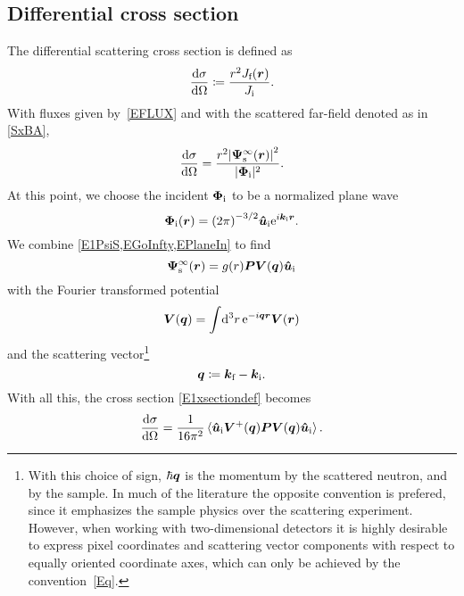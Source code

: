 \subsection{Differential cross section}\label{Sxsect0}

The differential scattering cross section is defined as
%
%
%
%
%
%
\begin{equation}\label{E1xsectiondef}
  \xElas
  \coloneqq  \frac{r^2 J_\sf(\r)}{J_\si}.
\end{equation}
%
%
With fluxes given by~\cref{EFLUX}
and with the scattered far-field denoted as in \cref{SxBA},
\begin{equation}\label{E1xsectiondef}
  \xElas
  = \frac{r^2 {|\v\Psi^\infty_\text{s}(\r)|}^2}{|\v\Phi_\si|^2}.
\end{equation}
At this point,
we choose the incident $\bm{\Phi}_{\text{i}}$ to be
a normalized plane wave
\begin{equation}\label{EPlaneIn}
   \v\Phi_\si(\r)
   = {(2\pi)}^{-3/2} \v{\hat u}_\si \e^{i\k_\si\r}.
\end{equation}
We combine \cref{E1PsiS,EGoInfty,EPlaneIn} to find
\begin{equation}\label{E1PsiS2}
  \v\Psi_\text{s}^\infty(\r)
  = g(r) \v{P} \TV(\v{q})\v{\hat u}_\si
\end{equation}
with the Fourier transformed potential
\begin{equation}
  \bm{V}(\bm{q})
  = \int\!\mathrm d^3r\,\mathrm e^{-i\bm{q}\bm{r}}\bm{V}(\bm{r})
\end{equation}
and the scattering vector\footnote
{With this choice of sign,
%
$\hbar\bm{q}$ is the momentum
%
 by the scattered neutron,
and  by the sample.
In much of the literature the opposite convention is prefered,
since it emphasizes the sample physics over the scattering experiment.
However, when working with two-dimensional detectors
it is highly desirable to express pixel coordinates
and scattering vector components
with respect to equally oriented coordinate axes,
which can only be achieved by the convention~\cref{Eq}.}
%
\begin{equation}\label{Eq}
  \q\coloneqq \k_\sf-\k_\si.
\end{equation}
%
With all this, the cross section \cref{E1xsectiondef} becomes
\begin{equation}\label{Exsection}
  \xElas
  = \frac{1}{16\pi^2} \braket{\v{\hat u}_\si\TV^+(\v{q})\v{P}\TV(\v{q})\v{\hat u}_\si}.
\end{equation}

